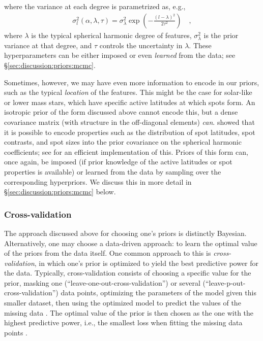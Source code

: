 \documentclass[modern]{aastex631}
\begin{document}
%
where the variance at each degree is parametrized as, e.g.,
%
\begin{align}
    \label{eq:powerspec}
    \sigma_l^2(\alpha, \lambda, \tau) = \sigma_\lambda^2 \exp\left(-\frac{(l - \lambda)^2}{2\tau^2}\right)
    \quad,
\end{align}
%
where $\lambda$ is the typical spherical harmonic degree of features, $\sigma_\lambda^2$ is the prior variance at that degree, and $\tau$ controls the uncertainty in $\lambda$.
These hyperparameters can be either imposed or even \emph{learned} from the data; see \S\ref{sec:discussion:priors:mcmc}.

Sometimes, however, we may have even more information to encode in our priors, such as the typical \emph{location} of the features. 
This might be the case for solar-like or lower mass stars, which have specific active latitudes at which spots form. 
An isotropic prior of the form discussed above cannot encode this, but a dense covariance matrix (with structure in the off-diagonal elements) \emph{can}. 
\citet{Luger2021b} showed that it is possible to encode properties such as the distribution of spot latitudes, spot contrasts, and spot sizes into the prior covariance on the spherical harmonic coefficients; see \citet{Luger2021d} for an efficient implementation of this. 
Priors of this form can, once again, be imposed (if prior knowledge of the active latitudes or spot properties is available) or learned from the data by sampling over the corresponding hyperpriors. 
We discuss this in more detail in \S\ref{sec:discussion:priors:mcmc} below.

\subsubsection{Cross-validation}
\label{sec:discussion:priors:crossval}
%
The approach discussed above for choosing one's priors is distinctly Bayesian.
Alternatively, one may choose a data-driven approach: to learn the optimal value of the priors from the data itself.
One common approach to this is \emph{cross-validation}, in which one's prior is optimized to yield the best predictive power for the data.
Typically, cross-validation consists of choosing a specific value for the prior, masking one (``leave-one-out-cross-validation'') or several (``leave-p-out-cross-validation'') data points, optimizing the parameters of the model given this smaller dataset, then using the optimized model to predict the values of the missing data .
The optimal value of the prior is then chosen as the one with the highest predictive power, i.e., the smallest loss when fitting the missing data points \citep[for an example of this, see \S 3.7 in][]{Luger2018}.
\end{document}
